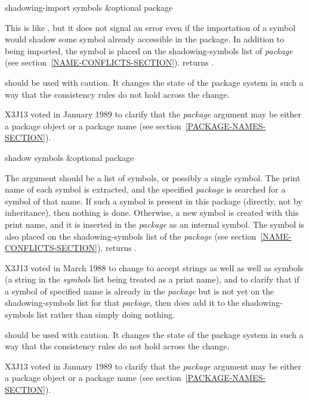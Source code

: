 \begin{defun}[Function]
shadowing-import symbols &optional package

This is like , but it does not signal an error even if the
importation of a symbol would shadow some symbol already accessible in
the package.  In addition to being imported, the symbol is placed on the
shadowing-symbols list of {\it package}
(see section~\ref{NAME-CONFLICTS-SECTION}).
 returns {\true}.

 should be used with
caution.  It changes the state of the package system in such a way that
the consistency rules do not hold across the change.

\begin{new}
X3J13 voted in January 1989
to clarify that the {\it package} argument may be either a package object
or a package name (see section~\ref{PACKAGE-NAMES-SECTION}).
\end{new}
\end{defun}

\begin{defun}[Function]
shadow symbols &optional package

The argument should be a list of symbols, or possibly a single symbol.
The print name of each symbol is extracted, and the specified {\it package} is
searched for a symbol of that name.  If such a symbol is present in this
package (directly, not by inheritance), then nothing is done.  Otherwise,
a new symbol is created with this print name, and it is inserted in the
{\it package} as an internal symbol.  The symbol is also placed on the
shadowing-symbols list of the {\it package}
(see section~\ref{NAME-CONFLICTS-SECTION}).
 returns {\true}.

\begin{newer}
X3J13 voted in March 1988 
to change  to accept strings as well as well as symbols
(a string in the {\it symbols} list being treated as a print name),
and to clarify that if a symbol of specified name is already in
the {\it package} but is not yet on the shadowing-symbols list
for that {\it package}, then  does add it to the shadowing-symbols
list rather than simply doing nothing.
\end{newer}

 should be used with
caution.  It changes the state of the package system in such a way that
the consistency rules do not hold across the change.

\begin{new}
X3J13 voted in January 1989
to clarify that the {\it package} argument may be either a package object
or a package name (see section~\ref{PACKAGE-NAMES-SECTION}).
\end{new}
\end{defun}

